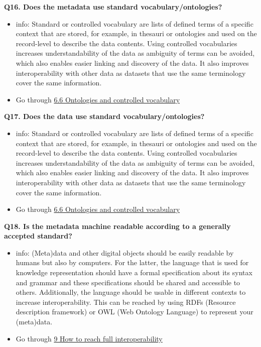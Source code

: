 \documentclass[
]{book}
\providecommand{\tightlist}{%
  \setlength{\itemsep}{0pt}\setlength{\parskip}{0pt}}
\begin{document}
\textbf{Q16. Does the metadata use standard vocabulary/ontologies?}

\begin{itemize}
\tightlist
\item
  info: Standard or controlled vocabulary are lists of defined terms of a specific context that are stored, for example, in thesauri or ontologies and used on the record-level to describe the data contents. Using controlled vocabularies increases understandability of the data as ambiguity of terms can be avoided, which also enables easier linking and discovery of the data. It also improves interoperability with other data as datasets that use the same terminology cover the same information.
\item
  Go through \protect\hyperlink{ontologies}{6.6 Ontologies and controlled vocabulary}
\end{itemize}

\textbf{Q17. Does the data use standard vocabulary/ontologies?}

\begin{itemize}
\tightlist
\item
  info: Standard or controlled vocabulary are lists of defined terms of a specific context that are stored, for example, in thesauri or ontologies and used on the record-level to describe the data contents. Using controlled vocabularies increases understandability of the data as ambiguity of terms can be avoided, which also enables easier linking and discovery of the data. It also improves interoperability with other data as datasets that use the same terminology cover the same information.
\item
  Go through \protect\hyperlink{ontologies}{6.6 Ontologies and controlled vocabulary}
\end{itemize}

\textbf{Q18. Is the metadata machine readable according to a generally accepted standard?}

\begin{itemize}
\tightlist
\item
  info: (Meta)data and other digital objects should be easily readable by humans but also by computers. For the latter, the language that is used for knowledge representation should have a formal specification about its syntax and grammar and these specifications should be shared and accessible to others. Additionally, the language should be usable in different contexts to increase interoperability. This can be reached by using RDFs (Resource description framework) or OWL (Web Ontology Language) to represent your (meta)data.
\item
  Go through \protect\hyperlink{fully-interoperable}{9 How to reach full interoperability}
\end{itemize}
\end{document}
